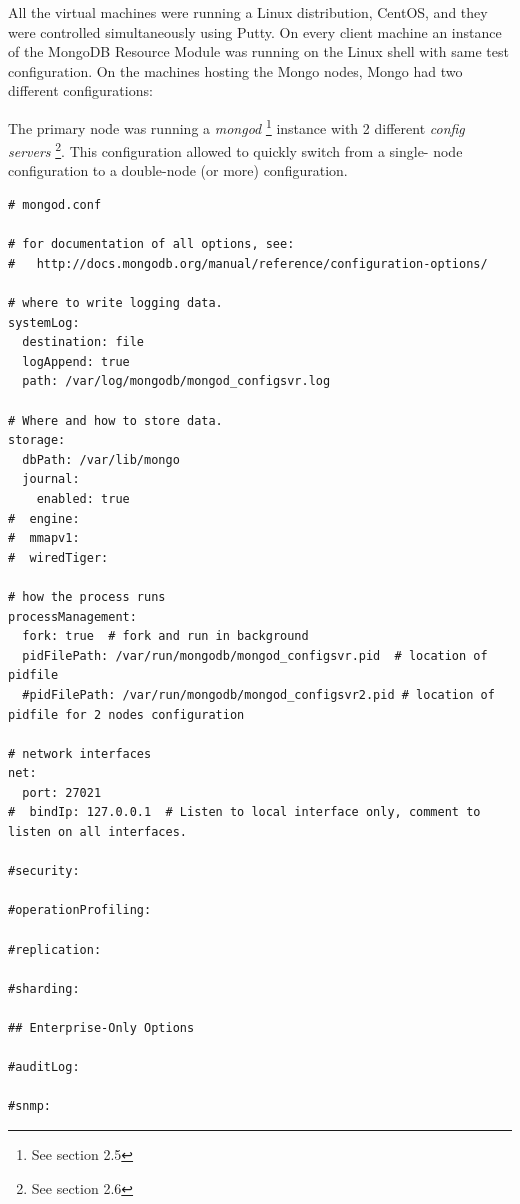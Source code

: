 All the virtual machines were running a Linux distribution, CentOS, and they were controlled simultaneously using Putty. On every  client machine an instance of the MongoDB Resource Module was running on the Linux shell with same test configuration.
On the machines hosting the Mongo nodes, Mongo had two different configurations: 


The primary node was running a \textit{mongod} \footnote{See section 2.5} instance with 2 different \textit{config servers} \footnote{See section 2.6}. This configuration allowed to quickly switch from a single- node configuration to a double-node (or more) configuration.
\begin{lstlisting}
# mongod.conf

# for documentation of all options, see:
#   http://docs.mongodb.org/manual/reference/configuration-options/

# where to write logging data.
systemLog:
  destination: file
  logAppend: true
  path: /var/log/mongodb/mongod_configsvr.log

# Where and how to store data.
storage:
  dbPath: /var/lib/mongo
  journal:
    enabled: true
#  engine:
#  mmapv1:
#  wiredTiger:

# how the process runs
processManagement:
  fork: true  # fork and run in background
  pidFilePath: /var/run/mongodb/mongod_configsvr.pid  # location of pidfile
  #pidFilePath: /var/run/mongodb/mongod_configsvr2.pid # location of pidfile for 2 nodes configuration

# network interfaces
net:
  port: 27021
#  bindIp: 127.0.0.1  # Listen to local interface only, comment to listen on all interfaces.

#security:

#operationProfiling:

#replication:

#sharding:

## Enterprise-Only Options

#auditLog:

#snmp:
\end{lstlisting}


